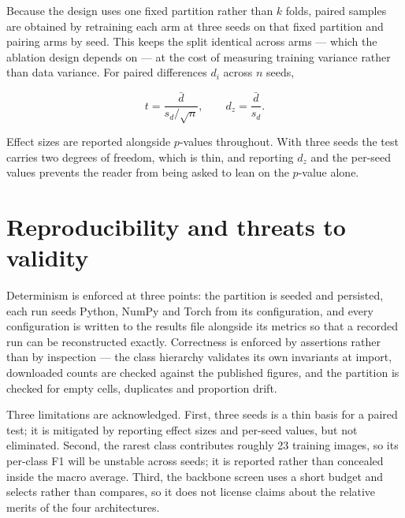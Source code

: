 \documentclass[11pt,a4paper]{article}
\begin{document}
Because the design uses one fixed partition rather than $k$ folds, paired samples
are obtained by retraining each arm at three seeds on that fixed partition and
pairing arms by seed. This keeps the split identical across arms --- which the
ablation design depends on --- at the cost of measuring training variance rather
than data variance. For paired differences $d_i$ across $n$ seeds,

\begin{equation}
  t = \frac{\bar{d}}{s_d/\sqrt{n}},
  \qquad
  d_z = \frac{\bar{d}}{s_d}.
  \label{eq:ttest}
\end{equation}

Effect sizes are reported alongside $p$-values throughout. With three seeds the
test carries two degrees of freedom, which is thin, and reporting $d_z$ and the
per-seed values prevents the reader from being asked to lean on the $p$-value
alone.

\section{Reproducibility and threats to validity}

Determinism is enforced at three points: the partition is seeded and persisted,
each run seeds Python, NumPy and Torch from its configuration, and every
configuration is written to the results file alongside its metrics so that a
recorded run can be reconstructed exactly. Correctness is enforced by assertions
rather than by inspection --- the class hierarchy validates its own invariants at
import, downloaded counts are checked against the published figures, and the
partition is checked for empty cells, duplicates and proportion drift.

Three limitations are acknowledged. First, three seeds is a thin basis for a
paired test; it is mitigated by reporting effect sizes and per-seed values, but
not eliminated. Second, the rarest class contributes roughly 23 training images,
so its per-class F1 will be unstable across seeds; it is reported rather than
concealed inside the macro average. Third, the backbone screen uses a short
budget and selects rather than compares, so it does not license claims about the
relative merits of the four architectures.
\end{document}

